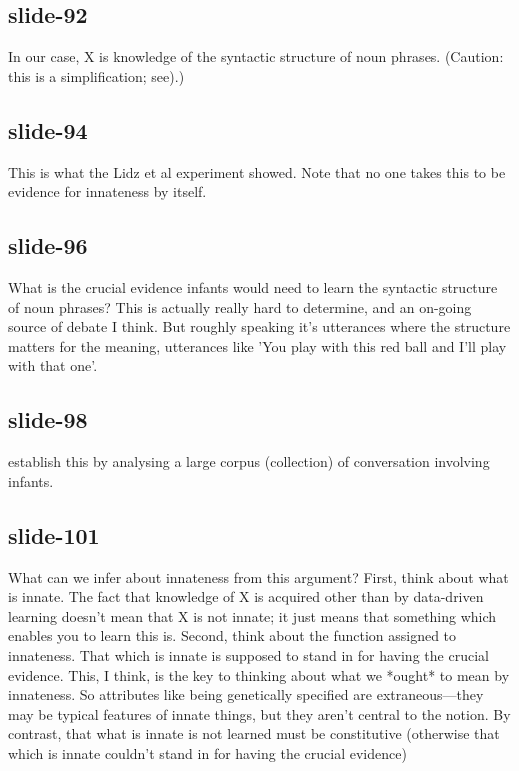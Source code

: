 \documentclass[12pt,\papersize]{extarticle}
\begin{document}
 
\subsection{slide-92}
In our case, X is knowledge of the syntactic structure of noun phrases. (Caution: this is a simplification; see\citet[p,\ 158]{lidz:2004_reaffirming}).)
 
 
\subsection{slide-94}
This is what the Lidz et al experiment showed.
Note that no one takes this to be evidence for innateness by itself.
 
 
\subsection{slide-96}
What is the crucial evidence infants would need to learn the syntactic structure of noun phrases?
This is actually really hard to determine, and an on-going source of debate I think.
But roughly speaking it's utterances where the structure matters for the meaning, utterances like 'You play with this red ball and I'll play with that one'.
 
 
\subsection{slide-98}
\citet{lidz:2003_what} establish this by analysing a large corpus (collection) of conversation involving infants.
 
 
\subsection{slide-101}
What can we infer about innateness from this argument?
First, think about what is innate. The fact that knowledge of X is acquired other than by data-driven learning doesn't mean that X is not innate; it just means that something which enables you to learn this is.
Second, think about the function assigned to innateness. That which is innate is supposed to stand in for having the crucial evidence.
This, I think, is the key to thinking about what we *ought* to mean by innateness.
So attributes like being genetically specified are extraneous---they may be typical features of innate things, but they aren't central to the notion.
By contrast, that what is innate is not learned must be constitutive (otherwise that which is innate couldn't stand in for having the crucial evidence)
 
\end{document}
